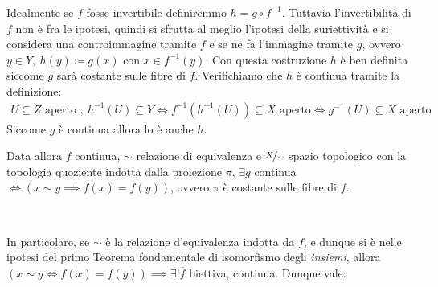 \begin{demonstration}
	Idealmente se $f$ fosse invertibile definiremmo $h=g\circ f^{-1}$. Tuttavia l'invertibilità di $f$ non è fra le ipotesi, quindi si sfrutta al meglio l'ipotesi della suriettività e si considera una controimmagine tramite $f$ e se ne fa l'immagine tramite $g$, ovvero $y\in Y, \ h(y)\coloneqq g(x)$ con $x\in f^{-1}(y)$. Con questa costruzione $h$ è ben definita siccome $g$ sarà costante sulle fibre di $f$. Verifichiamo che $h$ è continua tramite la definizione:
		\begin{gather*}
			U\subseteq Z \text{ aperto }, \ h^{-1}(U)\subseteq Y \iff f^{-1}(h^{-1}(U))\subseteq X \text{ aperto} \iff g^{-1}(U)\subseteq X \text{ aperto}
		\end{gather*}
	\vspace{-2mm}
	Siccome $g$ è continua allora lo è anche $h$.
\end{demonstration}
\begin{minipage}[t]{0.83\textwidth} \label{proprietà identificazione quoziente e mappa continua indotta}
Data allora $f$ continua, $\sim$ relazione di equivalenza e $\nicefrac{X}{\sim}$ spazio topologico con la topologia quoziente indotta dalla proiezione $\pi$, $\exists g$ continua $\iff \left( x\sim y \implies f(x)=f(y) \right)$, ovvero $\pi$ è costante sulle fibre di $f$.
\end{minipage}
\begin{minipage}[t]{0.16\textwidth}\vspace{-10pt}
	\end{minipage}\\
\hspace{-1mm}
\begin{minipage}[t]{0.83\textwidth}\vspace{2mm}
In particolare, se $\sim$ è la relazione d'equivalenza indotta da $f$, e dunque si è nelle ipotesi del primo Teorema fondamentale di isomorfismo degli \textit{insiemi}, allora $\left( x\sim y \iff f(x)=f(y) \right) \implies \exists ! \overline{f}$ biettiva, continua. Dunque vale:
	 	\end{minipage}
	\begin{minipage}[t]{0.16\textwidth}\vspace{-1pt}
	\end{minipage}\vspace{-1.5mm}\\
